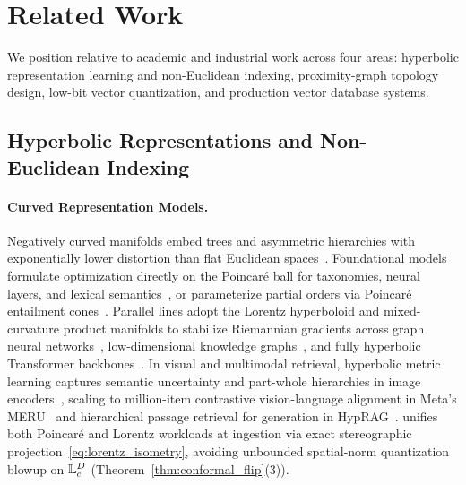 \section{Related Work}
\label{sec:related}

We position \rquiver{} relative to academic and industrial work across four areas: hyperbolic representation learning and non-Euclidean indexing, proximity-graph topology design, low-bit vector quantization, and production vector database systems.

\subsection{Hyperbolic Representations and Non-Euclidean Indexing}
\label{subsec:rel_hyperbolic}

\paragraph{Curved Representation Models.}
Negatively curved manifolds embed trees and asymmetric hierarchies with exponentially lower distortion than flat Euclidean spaces~\cite{nickel2017poincare,sala2018representation}.
Foundational models formulate optimization directly on the {Poincar\'e} ball for taxonomies, neural layers, and lexical semantics~\cite{ganea2018hyperbolic,tifrea2019poincare}, or parameterize partial orders via {Poincar\'e} entailment cones~\cite{ganea2018entailment}.
Parallel lines adopt the {Lorentz} hyperboloid and mixed-curvature product manifolds to stabilize Riemannian gradients across graph neural networks~\cite{nickel2018lorentz,chami2019hgcn,gu2019mixed}, low-dimensional knowledge graphs~\cite{chami2020low}, and fully hyperbolic Transformer backbones~\cite{chen2022fully}.
In visual and multimodal retrieval, hyperbolic metric learning captures semantic uncertainty and part-whole hierarchies in image encoders~\cite{khrulkov2020hyperbolic,ermolov2022hyperbolic}, scaling to million-item contrastive vision-language alignment in Meta's {MERU}~\cite{desai2023meru} and hierarchical passage retrieval for generation in {HypRAG}~\cite{madhu2026hyprag,lewis2020rag}.
\rquiver{} unifies both {Poincar\'e} and {Lorentz} workloads at ingestion via exact stereographic projection~\eqref{eq:lorentz_isometry}, avoiding unbounded spatial-norm quantization blowup on $\mathbb{L}_c^D$ (Theorem~\ref{thm:conformal_flip}(3)).

